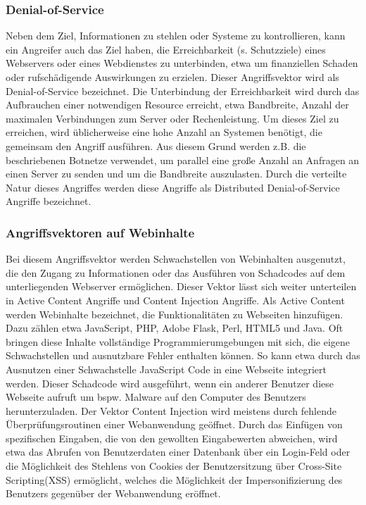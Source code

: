 \subsubsection{Denial-of-Service}
Neben dem Ziel, Informationen zu stehlen oder Systeme zu kontrollieren, kann ein Angreifer auch das Ziel haben, die Erreichbarkeit (s. Schutzziele) eines Webservers oder eines Webdienstes zu unterbinden, etwa um finanziellen Schaden oder rufschädigende Auswirkungen zu erzielen. Dieser Angriffsvektor wird als \glqq Denial-of-Service \grqq{} bezeichnet. Die Unterbindung der Erreichbarkeit wird durch das Aufbrauchen einer notwendigen Resource erreicht, etwa Bandbreite, Anzahl der maximalen Verbindungen zum Server oder Rechenleistung. Um dieses Ziel zu erreichen, wird üblicherweise eine hohe Anzahl an Systemen benötigt, die gemeinsam den Angriff ausführen. Aus diesem Grund werden z.B. die beschriebenen Botnetze verwendet, um parallel eine große Anzahl an Anfragen an einen Server zu senden und um die Bandbreite auszulasten. Durch die verteilte Natur dieses Angriffes werden diese Angriffe als \glqq Distributed Denial-of-Service\grqq{} Angriffe bezeichnet\citep{Campbell2016}.

\subsubsection{Angriffsvektoren auf Webinhalte}
Bei diesem Angriffsvektor werden Schwachstellen von Webinhalten ausgenutzt, die den Zugang zu Informationen oder das Ausführen von Schadcodes auf dem unterliegenden Webserver ermöglichen. Dieser Vektor lässt sich weiter unterteilen in \glqq Active Content\grqq{}  Angriffe und \glqq Content Injection\grqq{} Angriffe. 
Als Active Content werden Webinhalte bezeichnet, die Funktionalitäten zu Webseiten hinzufügen. Dazu zählen etwa JavaScript, PHP, Adobe Flask, Perl, HTML5 und Java. Oft bringen diese Inhalte vollständige Programmierumgebungen mit sich, die eigene Schwachstellen und ausnutzbare Fehler enthalten können. So kann etwa durch das Ausnutzen einer Schwachstelle JavaScript Code in eine Webseite integriert werden. Dieser Schadcode wird ausgeführt, wenn ein anderer Benutzer diese Webseite aufruft um bspw. Malware auf den Computer des Benutzers herunterzuladen. 
Der Vektor Content Injection wird meistens durch fehlende Überprüfungsroutinen einer Webanwendung geöffnet. Durch das Einfügen von spezifischen Eingaben, die von den gewollten Eingabewerten abweichen, wird etwa das Abrufen von Benutzerdaten einer Datenbank über ein Login-Feld oder die Möglichkeit des Stehlens von Cookies der Benutzersitzung über \glqq Cross-Site Scripting\grqq  (XSS) ermöglicht, welches die Möglichkeit der Impersonifizierung des Benutzers gegenüber der Webanwendung eröffnet\citep{Campbell2016}.

